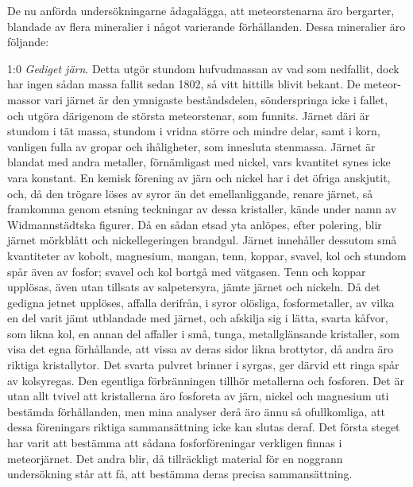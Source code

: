 \documentclass[a4paper, 12pt, oneside, swedish]{article}
\begin{document}
De nu anförda undersökningarne ådagalägga, att meteorstenarna äro bergarter, blandade av flera mineralier i något varierande förhållanden. Dessa mineralier äro följande:

1:0 \emph{Gediget järn}. Detta utgör stundom hufvudmassan av vad som nedfallit, dock har ingen sådan massa fallit sedan 1802, så vitt hittills blivit bekant. De meteor-massor vari järnet är den ymnigaste beståndsdelen, sönderspringa icke i fallet, och utgöra därigenom de största meteorstenar, som funnits. Järnet däri är stundom i tät massa, stundom i vridna större och mindre delar, samt i korn, vanligen fulla av gropar och ihåligheter, som innesluta stenmassa. Järnet är blandat med andra metaller, förnämligast med nickel, vars kvantitet synes icke vara konstant. En kemisk förening av järn och nickel har i det öfriga anskjutit, och, då den trögare löses av syror än det emellanliggande, renare järnet, så framkomma genom etsning teckningar av dessa kristaller, kände under namn av Widmannstädtska figurer. Då en sådan etsad yta anlöpes, efter polering, blir järnet mörkblått och nickellegeringen brandgul. Järnet innehåller dessutom små kvantiteter av kobolt, magnesium, mangan, tenn, koppar, svavel, kol och stundom spår även av fosfor; svavel och kol bortgå med vätgasen. Tenn och koppar upplösas, även utan tillsats av salpetersyra, jämte järnet och nickeln. Då det gedigna jetnet upplöses, affalla derifrån, i syror olösliga, fosformetaller, av vilka en del varit jämt utblandade med järnet, och afskilja sig i lätta, svarta kåfvor, som likna kol, en annan del affaller i små, tunga, metallglänsande kristaller, som visa det egna förhållande, att vissa av deras sidor likna brottytor, då andra äro riktiga kristallytor. Det svarta pulvret brinner i syrgas, ger därvid ett ringa spår av kolsyregas. Den egentliga förbränningen tillhör metallerna och fosforen. Det är utan allt tvivel att kristallerna äro fosforeta av järn, nickel och magnesium uti bestämda förhållanden, men mina analyser derå äro ännu så ofullkomliga, att dessa föreningars riktiga sammansättning icke kan slutas deraf. Det första steget har varit att bestämma att sådana fosforföreningar verkligen finnas i meteorjärnet. Det andra blir, då tillräckligt material för en noggrann undersökning står att få, att bestämma deras precisa sammansättning.
\end{document}
